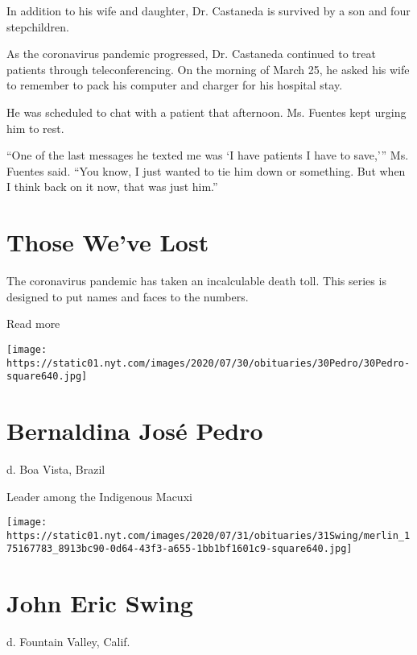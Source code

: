 In addition to his wife and daughter, Dr. Castaneda is survived by a son
and four stepchildren.

As the coronavirus pandemic progressed, Dr. Castaneda continued to treat
patients through teleconferencing. On the morning of March 25, he asked
his wife to remember to pack his computer and charger for his hospital
stay.

He was scheduled to chat with a patient that afternoon. Ms. Fuentes kept
urging him to rest.

``One of the last messages he texted me was `I have patients I have to
save,''' Ms. Fuentes said. ``You know, I just wanted to tie him down or
something. But when I think back on it now, that was just him.''

\href{https://www.nytimes.com/interactive/2020/obituaries/people-died-coronavirus-obituaries.html?action=click\&pgtype=Article\&state=default\&region=BELOW_MAIN_CONTENT\&context=covid_obits_promo}{}

\hypertarget{those-weve-lost}{%
\section{Those We've Lost}\label{those-weve-lost}}

The coronavirus pandemic has taken an incalculable death toll. This
series is designed to put names and faces to the numbers.

Read more

\texttt{[image: https://static01.nyt.com/images/2020/07/30/obituaries/30Pedro/30Pedro-square640.jpg]}

\hypertarget{bernaldina-josuxe9-pedro}{%
\section{Bernaldina José Pedro}\label{bernaldina-josuxe9-pedro}}

d. Boa Vista, Brazil

Leader among the Indigenous Macuxi

\texttt{[image: https://static01.nyt.com/images/2020/07/31/obituaries/31Swing/merlin\_175167783\_8913bc90-0d64-43f3-a655-1bb1bf1601c9-square640.jpg]}

\hypertarget{john-eric-swing}{%
\section{John Eric Swing}\label{john-eric-swing}}

d. Fountain Valley, Calif.

